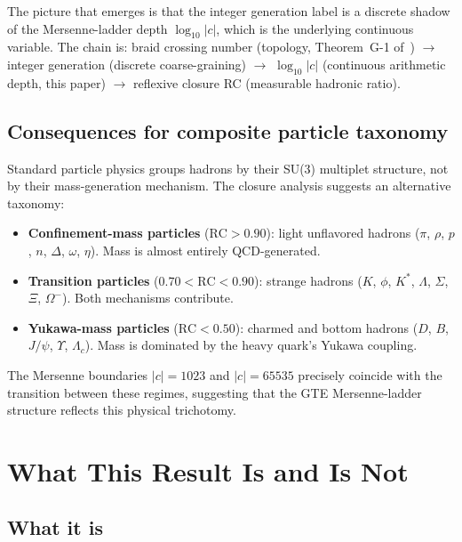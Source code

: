 \documentclass[12pt,a4paper]{article}
\newcommand{\RC}{\ensuremath{\mathrm{RC}}}
\begin{document}
The picture that emerges is that the integer generation label is a
discrete shadow of the Mersenne-ladder depth $\log_{10}|c|$, which is the
underlying continuous variable.
The chain is: braid crossing number (topology, Theorem~G-1 of~\cite{SpivackBraidAtlas})
$\to$ integer generation (discrete coarse-graining)
$\to$ $\log_{10}|c|$ (continuous arithmetic depth, this paper)
$\to$ reflexive closure RC (measurable hadronic ratio).

\subsection{Consequences for composite particle taxonomy}

Standard particle physics groups hadrons by their SU(3) multiplet structure,
not by their mass-generation mechanism.
The closure analysis suggests an alternative taxonomy:

\begin{itemize}[leftmargin=2em]
  \item \textbf{Confinement-mass particles} ($\RC > 0.90$):
    light unflavored hadrons ($\pi$, $\rho$, $p$, $n$, $\Delta$, $\omega$, $\eta$).
    Mass is almost entirely QCD-generated.
  \item \textbf{Transition particles} ($0.70 < \RC < 0.90$):
    strange hadrons ($K$, $\phi$, $K^*$, $\Lambda$, $\Sigma$, $\Xi$, $\Omega^-$).
    Both mechanisms contribute.
  \item \textbf{Yukawa-mass particles} ($\RC < 0.50$):
    charmed and bottom hadrons ($D$, $B$, $J/\psi$, $\Upsilon$, $\Lambda_c$).
    Mass is dominated by the heavy quark's Yukawa coupling.
\end{itemize}

The Mersenne boundaries $|c| = 1023$ and $|c| = 65535$ precisely coincide
with the transition between these regimes, suggesting that the GTE
Mersenne-ladder structure reflects this physical trichotomy.

\section{What This Result Is and Is Not}
\label{sec:interpretation}

\subsection{What it is}
\end{document}

